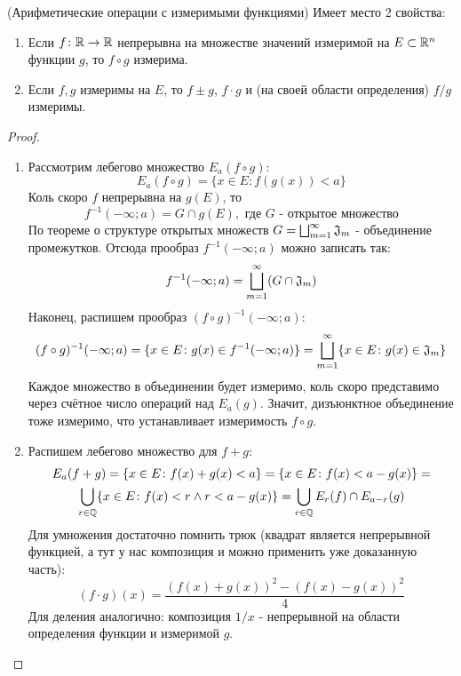 \begin{theorem} (Арифметические операции с измеримыми функциями) \label{arithmMF}
	Имеет место 2 свойства:
	\begin{enumerate}
		\item Если $f \colon \mathbb{R} \to \mathbb{R}$ непрерывна на множестве значений измеримой на $E \subset \mathbb{R}^n$ функции $g$, то $f \circ g$ измерима.
		
		\item Если $f, g$ измеримы на $E$, то $f \pm g$, $f \cdot g$ и (на своей области определения) $f / g$ измеримы.
	\end{enumerate}
\end{theorem}

\begin{proof}~
	\begin{enumerate}
		\item Рассмотрим лебегово множество $E_a(f \circ g)$:
		\[
			E_a(f \circ g) = \{x \in E \colon f(g(x)) < a\}
		\]
		Коль скоро $f$ непрерывна на $g(E)$, то
		\[
			f^{-1}(-\infty; a) = G \cap g(E), \text{ где $G$ - открытое множество}
		\]
		По теореме о структуре открытых множеств $G = \bigsqcup_{m = 1}^\infty \mathfrak{J}_m$ - объединение промежутков. Отсюда прообраз $f^{-1}(-\infty; a)$ можно записать так:
		\[
			f^{-1}(-\infty; a) = \bigsqcup_{m = 1}^\infty (G \cap \mathfrak{J}_m)
		\]
		Наконец, распишем прообраз $(f \circ g)^{-1}(-\infty; a)$:
		\[
			(f \circ g)^{-1}(-\infty; a) = \{x \in E \colon g(x) \in f^{-1}(-\infty; a)\} = \bigsqcup_{m = 1}^\infty \{x \in E \colon g(x) \in \mathfrak{J}_m\}
		\]
		Каждое множество в объединении будет измеримо, коль скоро представимо через счётное число операций над $E_a(g)$. Значит, дизъюнктное объединение тоже измеримо, что устанавливает измеримость $f \circ g$.
		
		\item Распишем лебегово множество для $f + g$:
		\begin{multline*}
			E_a(f + g) = \{x \in E \colon f(x) + g(x) < a\} = \{x \in E \colon f(x) < a - g(x)\} =
			\\
			\bigcup_{r \in \mathbb{Q}} \{x \in E \colon f(x) < r \wedge r < a - g(x)\} = \bigcup_{r \in \mathbb{Q}} E_r(f) \cap E_{a - r}(g)
		\end{multline*}
		Для умножения достаточно помнить трюк (квадрат является непрерывной функцией, а тут у нас композиция и можно применить уже доказанную часть):
		\[
			(f \cdot g)(x) = \frac{(f(x) + g(x))^2 - (f(x) - g(x))^2}{4}
		\]
		Для деления аналогично: композиция $1 / x$ - непрерывной на области определения функции и измеримой $g$.
	\end{enumerate}
\end{proof}


